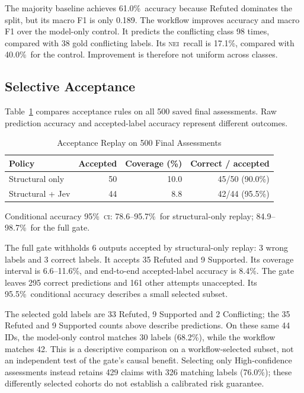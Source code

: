 \documentclass[conference]{IEEEtran}
\newcommand{\NEI}{\textsc{nei}}
\newcommand{\CI}{\textsc{ci}}
\newcommand{\pct}{\%}
\begin{document}
The majority baseline achieves 61.0\pct\ accuracy because Refuted dominates the split, but its macro F1 is only 0.189. The workflow improves accuracy and macro F1 over the model-only control. It predicts the conflicting class 98 times, compared with 38 gold conflicting labels. Its \NEI\ recall is 17.1\pct, compared with 40.0\pct\ for the control. Improvement is therefore not uniform across classes.

\subsection{Selective Acceptance}
Table~\ref{tab:acceptance} compares acceptance rules on all 500 saved final assessments. Raw prediction accuracy and accepted-label accuracy represent different outcomes.

\begin{table}[t]
\caption{Acceptance Replay on 500 Final Assessments}
\label{tab:acceptance}
\centering
\footnotesize
\begin{tabular}{@{}lrrr@{}}
\toprule
Policy & Accepted & Coverage (\pct) & Correct / accepted\\
\midrule
Structural only & 50 & 10.0 & 45/50 (90.0\pct)\\
Structural + Jev & 44 & 8.8 & 42/44 (95.5\pct)\\
\bottomrule
\end{tabular}
\par\smallskip
\parbox{\columnwidth}{\footnotesize Conditional accuracy 95\pct\ \CI: 78.6--95.7\pct\ for structural-only replay; 84.9--98.7\pct\ for the full gate.}
\end{table}

The full gate withholds 6 outputs accepted by structural-only replay: 3 wrong labels and 3 correct labels. It accepts 35 Refuted and 9 Supported. Its coverage interval is 6.6--11.6\pct, and end-to-end accepted-label accuracy is 8.4\pct. The gate leaves 295 correct predictions and 161 other attempts unaccepted. Its 95.5\pct\ conditional accuracy describes a small selected subset.

The selected gold labels are 33 Refuted, 9 Supported and 2 Conflicting; the 35 Refuted and 9 Supported counts above describe predictions. On these same 44 IDs, the model-only control matches 30 labels (68.2\pct), while the workflow matches 42. This is a descriptive comparison on a workflow-selected subset, not an independent test of the gate's causal benefit. Selecting only High-confidence assessments instead retains 429 claims with 326 matching labels (76.0\pct); these differently selected cohorts do not establish a calibrated risk guarantee.
\end{document}
